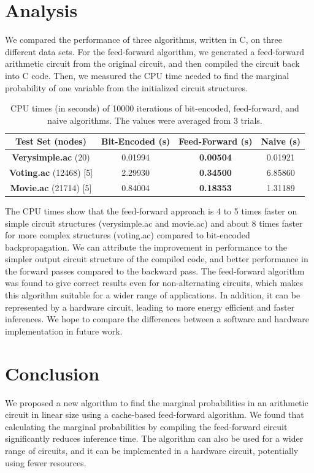 \documentclass[11pt,a4paper, final, twoside]{article}
\theoremstyle{proposition}
\theoremstyle{definition}
\theoremstyle{remark}
\numberwithin{equation}{section}
\begin{document}
\section{Analysis}\label{I4}

We compared the performance of three algorithms, written in C, on three different data sets. For the feed-forward algorithm, we generated a feed-forward arithmetic circuit from the original circuit, and then compiled the circuit back into C code. Then, we measured the CPU time needed to find the marginal probability of one variable from the initialized circuit structures. 


 \begin{table}[h!]
 \centering
 \begin{tabular}{||c c c c ||} 
 \hline
 \textbf{Test Set} (nodes) & Bit-Encoded (s) & \textbf{Feed-Forward} (s) & Naive (s)\\ %
 \hline\hline
 \textbf{Verysimple.ac} (20) & 0.01994 & \textbf{0.00504} & 0.01921\\ 
 \hline
 \textbf{Voting.ac} (12468) [5] & 2.29930 & \textbf{0.34500} & 6.85860\\
 \hline
 \textbf{Movie.ac} (21714) [5] & 0.84004 & \textbf{0.18353} & 1.31189\\ %
 \hline
\end{tabular}
\caption{CPU times (in seconds) of 10000 iterations of bit-encoded, feed-forward, and naive algorithms. The values were averaged from 3 trials. }
\end{table}

The CPU times show that the feed-forward approach is 4 to 5 times faster on simple circuit structures (verysimple.ac and movie.ac) and about 8 times faster for more complex structures (voting.ac) compared to bit-encoded backpropagation. We can attribute the improvement in performance to the simpler output circuit structure of the compiled code, and better performance in the forward passes compared to the backward pass. The feed-forward algorithm was found to give correct results even for non-alternating circuits, which makes this algorithm suitable for a wider range of applications. In addition, it can be represented by a hardware circuit, leading to more energy efficient and faster inferences. We hope to compare the differences between a software and hardware implementation in future work. 
\newpage

\section{Conclusion}
We proposed a new algorithm to find the marginal probabilities in an arithmetic circuit in linear size using a cache-based feed-forward algorithm. We found that calculating the marginal probabilities by compiling the feed-forward circuit significantly reduces inference time. The algorithm can also be used for a wider range of circuits, and it can be implemented in a hardware circuit, potentially using fewer resources. 
\end{document}
